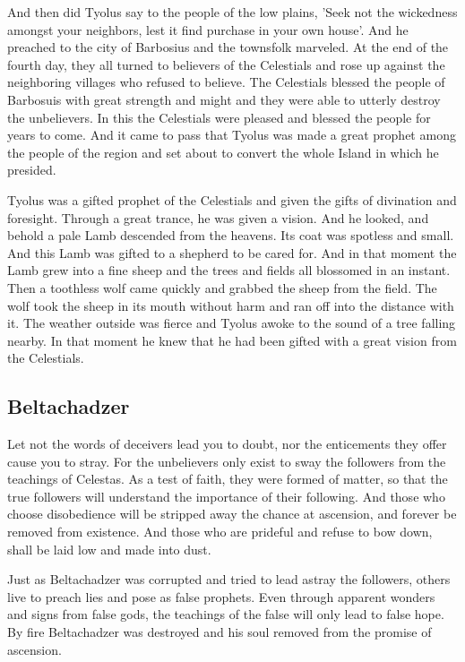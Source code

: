 And then did Tyolus say to the people of the low plains, 'Seek not the wickedness amongst your neighbors, lest it find purchase in your own house'. And he preached to the city of Barbosius and the townsfolk marveled. At the end of the fourth day, they all turned to believers of the Celestials and rose up against the neighboring villages who refused to believe. The Celestials blessed the people of Barbosuis with great strength and might and they were able to utterly destroy the unbelievers. In this the Celestials were pleased and blessed the people for years to come. And it came to pass that Tyolus was made a great prophet among the people of the region and set about to convert the whole Island in which he presided. 

Tyolus was a gifted prophet of the Celestials and given the gifts of divination and foresight. Through a great trance, he was given a vision. And he looked, and behold a pale Lamb descended from the heavens. Its coat was spotless and small. And this Lamb was gifted to a shepherd to be cared for. And in that moment the Lamb grew into a fine sheep and the trees and fields all blossomed in an instant. Then a toothless wolf came quickly and grabbed the sheep from the field. The wolf took the sheep in its mouth without harm and ran off into the distance with it. The weather outside was fierce and Tyolus awoke to the sound of a tree falling nearby. In that moment he knew that he had been gifted with a great vision from the Celestials.

\subsection{Beltachadzer}

Let not the words of deceivers lead you to doubt, nor the enticements they offer cause you to stray. For the unbelievers only exist to sway the followers from the teachings of Celestas. As a test of faith, they were formed of matter, so that the true followers will understand the importance of their following. And those who choose disobedience will be stripped away the chance at ascension, and forever be removed from existence. And those who are prideful and refuse to bow down, shall be laid low and made into dust. 

Just as Beltachadzer was corrupted and tried to lead astray the followers, others live to preach lies and pose as false prophets. Even through apparent wonders and signs from false gods, the teachings of the false will only lead to false hope. By fire Beltachadzer was destroyed and his soul removed from the promise of ascension.

